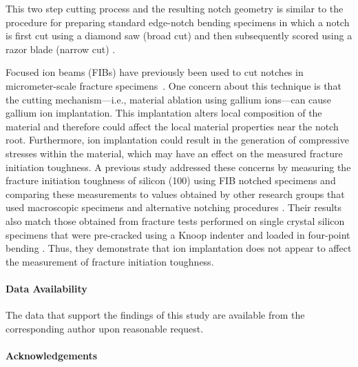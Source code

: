 \documentclass[12pt,onecolumn]{article}
\begin{document}
This two step cutting process and the resulting notch geometry is similar to the procedure for preparing standard edge-notch bending specimens in which a notch is first cut using a diamond saw (broad cut) and then subsequently scored using a razor blade (narrow cut) \cite{rocha2006effect,kubler1997fracture,damani1996critical}.

Focused ion beams (FIBs) have previously been used to cut notches in micrometer-scale fracture specimens~\cite{jaya2015can,fett2008fracture,ochiai2014fracture,morishita2006fracture}.  One concern about this technique is that the cutting mechanism---i.e., material ablation using gallium ions---can cause gallium ion implantation. This implantation alters local composition of the material and therefore could affect the local material properties near the notch root. Furthermore, ion implantation could result in the generation of compressive stresses within the material, which may have an effect on the measured fracture initiation toughness. A previous study \cite{jaya2015can} addressed these concerns by measuring the fracture initiation toughness of silicon (100) using FIB notched specimens and comparing these measurements to values obtained by other research groups that used macroscopic specimens and alternative notching procedures \cite{ritchie2003failure}. Their results also match those obtained from fracture tests performed on single crystal silicon specimens that were pre-cracked using a Knoop indenter and loaded in four-point bending \cite{chen1980fracture}. Thus, they demonstrate that ion implantation does not appear to affect the measurement of fracture initiation toughness.

\singlespacing

\paragraph{Data Availability}

The data that support the findings of this study are available from the corresponding author upon reasonable request.





\paragraph{Acknowledgements} %
\end{document}
